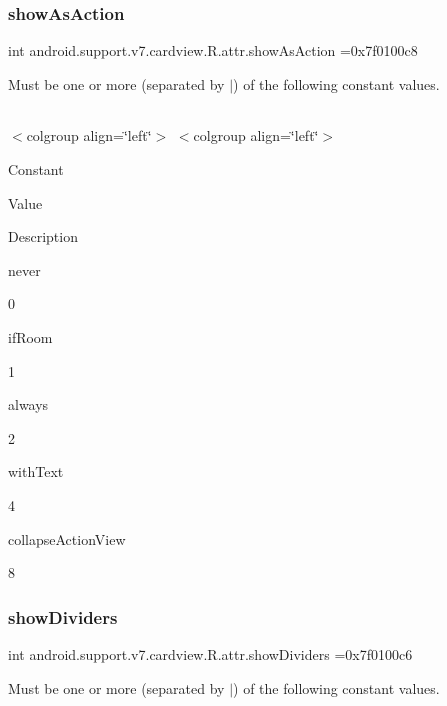 \subsubsection{\texorpdfstring{show\+As\+Action}{showAsAction}}
{\footnotesize\ttfamily int android.\+support.\+v7.\+cardview.\+R.\+attr.\+show\+As\+Action =0x7f0100c8\hspace{0.3cm}{\ttfamily [static]}}

Must be one or more (separated by \textquotesingle{}$\vert$\textquotesingle{}) of the following constant values.

\tabulinesep=1mm
\begin{longtabu} spread 0pt [c]{*{0}{|X[-1]}|}
\hline
\end{longtabu}
$<$colgroup align=\char`\"{}left\char`\"{}$>$ $<$colgroup align=\char`\"{}left\char`\"{}$>$ 

Constant

Value

Description 

{\ttfamily never}

0

{\ttfamily if\+Room}

1

{\ttfamily always}

2

{\ttfamily with\+Text}

4

{\ttfamily collapse\+Action\+View}

8\mbox{\label{classandroid_1_1support_1_1v7_1_1cardview_1_1R_1_1attr_aee3b93a16dbd1e9064e91302644b0209}} 
\subsubsection{\texorpdfstring{show\+Dividers}{showDividers}}
{\footnotesize\ttfamily int android.\+support.\+v7.\+cardview.\+R.\+attr.\+show\+Dividers =0x7f0100c6\hspace{0.3cm}{\ttfamily [static]}}

Must be one or more (separated by \textquotesingle{}$\vert$\textquotesingle{}) of the following constant values.

